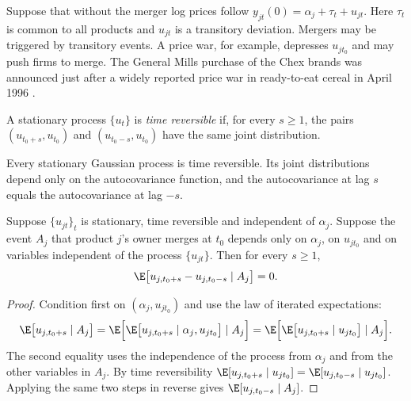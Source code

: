 Suppose that without the merger log prices follow $y_{jt}(0)=\alpha_j+\tau_t+u_{jt}$. Here $\tau_t$ is common to
all products and $u_{jt}$ is a transitory deviation. Mergers may be triggered by transitory events. A price war,
for example, depresses $u_{j t_0}$ and may push firms to merge. The General Mills purchase of the Chex brands was
announced just after a widely reported price war in ready-to-eat cereal in April 1996 \citep[p.~15]{AshenfelterHosken2008}.

\begin{definition}\label{def:11-reversible}
A stationary process $\{u_t\}$ is \emph{time reversible} if, for every $s\ge1$, the pairs $(u_{t_0+s},u_{t_0})$ and
$(u_{t_0-s},u_{t_0})$ have the same joint distribution.
\end{definition}

Every stationary Gaussian process is time reversible. Its joint distributions depend only on the autocovariance
function, and the autocovariance at lag $s$ equals the autocovariance at lag $-s$.

\begin{proposition}\label{prop:11-window}
Suppose $\{u_{jt}\}_t$ is stationary, time reversible and independent of $\alpha_j$. Suppose the event $A_j$ that
product $j$'s owner merges at $t_0$ depends only on $\alpha_j$, on $u_{jt_0}$ and on variables independent of the
process $\{u_{jt}\}$. Then for every $s\ge1$,
\begin{equation*}
\E\big[u_{j,t_0+s}-u_{j,t_0-s}\mid A_j\big]=0.
\end{equation*}
\end{proposition}

\begin{proof}
Condition first on $(\alpha_j,u_{jt_0})$ and use the law of iterated expectations:
\begin{equation*}
\E\big[u_{j,t_0+s}\mid A_j\big]=\E\Big[\E\big[u_{j,t_0+s}\mid \alpha_j,u_{jt_0}\big]\mid A_j\Big]
=\E\Big[\E\big[u_{j,t_0+s}\mid u_{jt_0}\big]\mid A_j\Big].
\end{equation*}
The second equality uses the independence of the process from $\alpha_j$ and from the other variables in $A_j$. By
time reversibility $\E[u_{j,t_0+s}\mid u_{jt_0}]=\E[u_{j,t_0-s}\mid u_{jt_0}]$. Applying the same two steps
in reverse gives $\E[u_{j,t_0-s}\mid A_j]$.
\end{proof}

